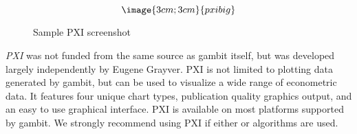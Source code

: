 \begin{figure}
$$\image{3cm;3cm}{pxibig}$$
\caption{Sample PXI screenshot}\label{fig_pxibig}
\end{figure}

{\em PXI} was not funded from the same source as gambit itself, but was 
developed largely independently by Eugene Grayver.  PXI is not limited to
plotting data generated by gambit, but can be used to visualize a wide range
of econometric data.  It features four unique chart types, publication quality
graphics output, and an easy to use graphical interface.  PXI is available on
most platforms supported by gambit.  We strongly recommend using PXI if
either  or  algorithms are used.





%
\setfooter{\thepage}{}{}{}{}{\thepage}%

